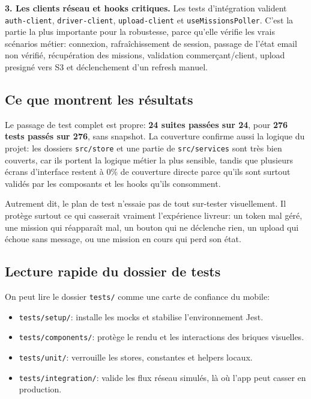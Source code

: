 \textbf{3. Les clients réseau et hooks critiques.} Les tests d'intégration valident \texttt{auth-client}, \texttt{driver-client}, \texttt{upload-client} et \texttt{useMissionsPoller}. C'est la partie la plus importante pour la robustesse, parce qu'elle vérifie les vrais scénarios métier: connexion, rafraîchissement de session, passage de l'état email non vérifié, récupération des missions, validation commerçant/client, upload presigné vers S3 et déclenchement d'un refresh manuel.

\subsection{Ce que montrent les résultats}

Le passage de test complet est propre: \textbf{24 suites passées sur 24}, pour \textbf{276 tests passés sur 276}, sans snapshot. La couverture confirme aussi la logique du projet: les dossiers \texttt{src/store} et une partie de \texttt{src/services} sont très bien couverts, car ils portent la logique métier la plus sensible, tandis que plusieurs écrans d'interface restent à 0\% de couverture directe parce qu'ils sont surtout validés par les composants et les hooks qu'ils consomment.

Autrement dit, le plan de test n'essaie pas de tout sur-tester visuellement. Il protège surtout ce qui casserait vraiment l'expérience livreur: un token mal géré, une mission qui réapparaît mal, un bouton qui ne déclenche rien, un upload qui échoue sans message, ou une mission en cours qui perd son état.

\subsection{Lecture rapide du dossier de tests}

On peut lire le dossier \texttt{tests/} comme une carte de confiance du mobile:
\begin{itemize}
	\item \texttt{tests/setup/}: installe les mocks et stabilise l'environnement Jest.
	\item \texttt{tests/components/}: protège le rendu et les interactions des briques visuelles.
	\item \texttt{tests/unit/}: verrouille les stores, constantes et helpers locaux.
	\item \texttt{tests/integration/}: valide les flux réseau simulés, là où l'app peut casser en production.
\end{itemize}

